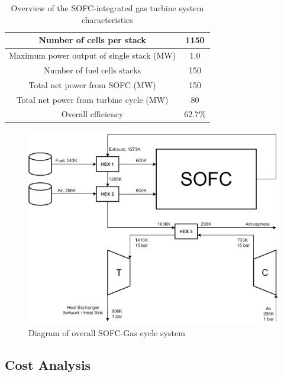 \documentclass{article}
\begin{document}

\begin{table}[h!]
\centering
\caption{Overview of the SOFC-integrated gas turbine system characteristics}
\label{LMtable:overview}
\begin{tabular}{|c|c|}
\hline
Number of cells per stack                 & 1150   \\ \hline
Maximum power output of single stack (MW) & 1.0    \\ \hline
Number of fuel cells stacks               & 150    \\ \hline
Total net power from SOFC (MW)            & 150    \\ \hline
Total net power from turbine cycle (MW)   & 80     \\ \hline
Overall efficiency                        & 62.7\% \\ \hline
\end{tabular}
\end{table}


\begin{figure}[htb]
    \centering
    \includegraphics[scale=0.2]{FinalSystemDiagram.png}
    \caption{Diagram of overall SOFC-Gas cycle system}
    \label{LMfig:finalsystemdiagram}
\end{figure}


\subsection{Cost Analysis}
\end{document}

